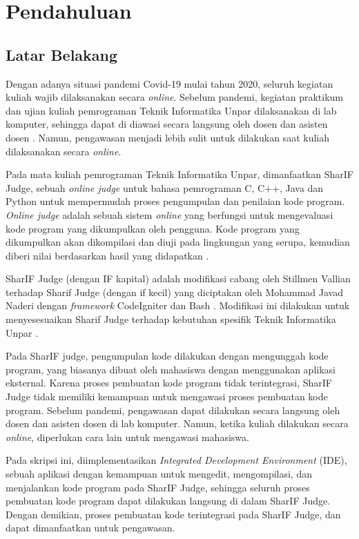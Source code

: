 \chapter{Pendahuluan}
\label{chap:intro}
   
\section{Latar Belakang}
\label{sec:label}

Dengan adanya situasi pandemi Covid-19 mulai tahun 2020, seluruh kegiatan kuliah wajib dilaksanakan secara \textit{online}. Sebelum pandemi, kegiatan praktikum dan ujian kuliah pemrograman Teknik Informatika Unpar dilaksanakan di lab komputer, sehingga dapat di diawasi secara langsung oleh dosen dan asisten dosen .  Namun, pengawasan menjadi lebih sulit untuk dilakukan saat kuliah dilaksanakan secara \textit{online}. 

Pada mata kuliah pemrograman Teknik Informatika Unpar, dimanfaatkan SharIF Judge, sebuah \textit{online judge} untuk bahasa pemrograman C, C++, Java dan Python untuk mempermudah proses pengumpulan dan penilaian kode program. \textit{Online judge} adalah sebuah sistem \textit{online} yang berfungsi untuk mengevaluasi kode program yang dikumpulkan oleh pengguna. Kode program yang dikumpulkan akan dikompilasi dan diuji pada lingkungan yang serupa, kemudian diberi nilai berdasarkan hasil yang didapatkan \cite{judge}.

SharIF Judge (dengan IF kapital) adalah modifikasi cabang oleh Stillmen Vallian terhadap Sharif Judge (dengan if kecil) yang diciptakan oleh Mohammad Javad Naderi dengan \textit{framework} CodeIgniter dan Bash \cite{sharif}. Modifikasi ini dilakukan untuk menyesesuaikan Sharif Judge terhadap kebutuhan spesifik Teknik Informatika Unpar \cite{stillmen:sharif}.

Pada SharIF judge, pengumpulan kode dilakukan dengan mengunggah kode program, yang biasanya dibuat oleh mahasiswa dengan menggunakan aplikasi eksternal. Karena proses pembuatan kode program tidak terintegrasi, SharIF Judge tidak memiliki kemampuan untuk mengawasi proses pembuatan kode program. Sebelum pandemi, pengawasan dapat dilakukan secara langsung oleh dosen dan asisten dosen di lab komputer. Namun, ketika kuliah dilakukan secara \textit{online}, diperlukan cara lain untuk mengawasi mahasiswa. 

Pada skripsi ini, diimplementasikan {\it Integrated Development Environment} (IDE), sebuah aplikasi dengan kemampuan untuk mengedit, mengompilasi, dan menjalankan kode program pada SharIF Judge, sehingga seluruh proses pembuatan kode program dapat dilakukan langsung di dalam SharIF Judge. Dengan demikian, proses pembuatan kode terintegrasi pada SharIF Judge, dan dapat dimanfaatkan untuk pengawasan.

